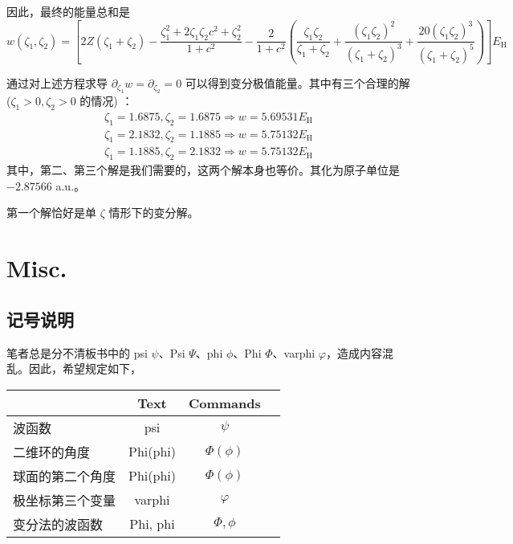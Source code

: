 因此，最终的能量总和是
\begin{equation}
    w(\zeta_1, \zeta_2) = \left[ 2 Z (\zeta_1 + \zeta_2) - \frac{\zeta_1^2 + 2 \zeta_1 \zeta_2 c^2 + \zeta_2^2}{1 + c^2} - \frac{2}{1 + c^2} \left( \frac{\zeta_1 \zeta_2}{\zeta_1 + \zeta_2} + \frac{(\zeta_1 \zeta_2)^2}{(\zeta_1 + \zeta_2)^3} + \frac{20 (\zeta_1 \zeta_2)^3}{(\zeta_1 + \zeta_2)^5} \right) \right] E_{\mathrm{H}}
\end{equation}

通过对上述方程求导 $\partial_{\zeta_1} w = \partial_{\zeta_2} = 0$ 可以得到变分极值能量。其中有三个合理的解 ($\zeta_1 > 0, \zeta_2 > 0$ 的情况)%
：
\begin{gather*}
    \zeta_1 = 1.6875, \zeta_2 = 1.6875 \Rightarrow w = 5.69531 E_\mathrm{H} \\
    \zeta_1 = 2.1832, \zeta_2 = 1.1885 \Rightarrow w = 5.75132 E_\mathrm{H} \\
    \zeta_1 = 1.1885, \zeta_2 = 2.1832 \Rightarrow w = 5.75132 E_\mathrm{H}
\end{gather*}
其中，第二、第三个解是我们需要的，这两个解本身也等价。其化为原子单位是 $-2.87566 $ a.u.。

第一个解恰好是单 $\zeta$ 情形下的变分解。




\chapter{Misc.}
\section{记号说明}
笔者总是分不清板书中的 psi $\psi$、Psi $\Psi$、phi $\phi$、Phi $\Phi$、varphi $\varphi$，造成内容混乱。因此，希望规定如下，
\begin{table}[ht]
    \centering
    \begin{tabular}[t]{lccc}
    \toprule
    &Text&Commands\\
    \midrule
    波函数 & psi & $\psi$ \\
    二维环的角度 & Phi(phi) & $\Phi(\phi)$ \\
    球面的第二个角度 & Phi(phi) & $\Phi(\phi) $ \\
    极坐标第三个变量 & varphi & $\varphi$ \\
    变分法的波函数 & Phi, phi & $\Phi, \phi$ \\
    \bottomrule
    \end{tabular}
\end{table}%


